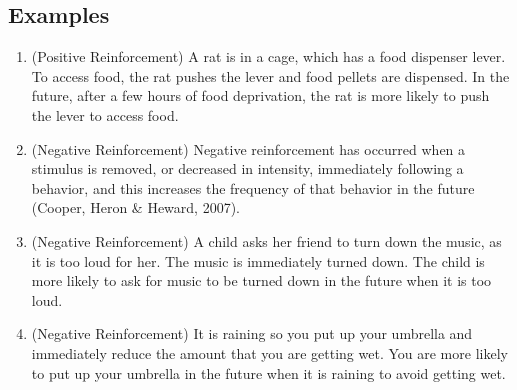 \subsection{Examples}
\begin{enumerate}
\item (Positive Reinforcement) A rat is in a cage, which has a food dispenser lever. To access food, the rat pushes the lever and food pellets are dispensed. In the future, after a few hours of food deprivation, the rat is more likely to push the lever to access food. 
\item (Negative Reinforcement) Negative reinforcement has occurred when a stimulus is removed, or decreased in intensity, immediately following a behavior, and this increases the frequency of that behavior in the future (Cooper, Heron \& Heward, 2007).
\item (Negative Reinforcement) A child asks her friend to turn down the music, as it is too loud for her. The music is immediately turned down. The child is more likely to ask for music to be turned down in the future when it is too loud.
\item (Negative Reinforcement) It is raining so you put up your umbrella and immediately reduce the amount that you are getting wet. You are more likely to put up your umbrella in the future when it is raining to avoid getting wet. 
\end{enumerate}
%
